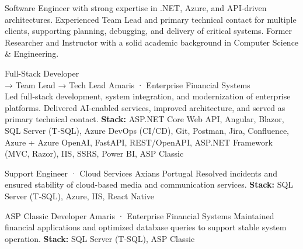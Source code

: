 \documentclass[
	a4paper,
]{fortysecondscv}
\begin{document}
\makefrontsidebar

Software Engineer with strong expertise in .NET, Azure, and API‑driven architectures. Experienced Team Lead and primary technical contact for multiple clients, supporting planning, debugging, and delivery of critical systems. Former Researcher and Instructor with a solid academic background in Computer Science & Engineering.

\begin{cvtable}[3]

        {Full-Stack Developer\\ → Team Lead → Tech Lead}
        {Amaris · Enterprise Financial Systems}
        {
        \\[-0.3em]
        Led full‑stack development, system integration, and modernization of enterprise platforms. 
         Delivered AI‑enabled services, improved architecture, and served as primary technical contact.
         \newline \textbf{Stack:} 
         {\color{skgreen}ASP.NET Core Web API},
         {\color{skgreen}Angular}, 
         {\color{sklimegreen}Blazor},
         {\color{sklimegreen}SQL Server (T‑SQL)}, 
         {\color{sklimegreen}Azure DevOps (CI/CD)}, 
         {\color{sklimegreen}Git}, 
         {\color{sklimegreen}Postman},
         {\color{sklimegreen}Jira},
         {\color{sklimegreen}Confluence},
         {\color{skyellow}Azure + Azure OpenAI},
         {\color{skyellow}FastAPI, REST/OpenAPI}, 
         {\color{skyellow}ASP.NET Framework (MVC, Razor)},
         {\color{skyellow}IIS},
         {\color{skyellow}SSRS, Power BI},
         {\color{skorange}ASP Classic}}

        {Support Engineer · Cloud Services}
        {Axians Portugal}
        {Resolved incidents and ensured stability of cloud-based media and communication services.
         \newline \textbf{Stack:} 
         {\color{sklimegreen}SQL Server (T‑SQL)},
         {\color{skyellow}Azure},
         {\color{skyellow}IIS},
         {\color{skorange}React Native}}

        {ASP Classic Developer}
        {Amaris · Enterprise Financial Systems}
        {Maintained financial applications and optimized database queries to support stable system operation.
         \newline \textbf{Stack:} 
         {\color{sklimegreen}SQL Server (T‑SQL)},
         {\color{skorange}ASP Classic}}


\end{cvtable}
\end{document}

